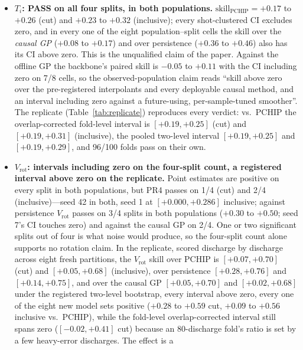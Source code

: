 \documentclass[10pt]{article}
\newcommand{\Ti}{\ensuremath{T_i}}
\newcommand{\Vrot}{\ensuremath{V_\mathrm{rot}}}
\newcommand{\skillp}{\ensuremath{\mathrm{skill}_{\mathrm{PCHIP}}}}
\begin{document}
\begin{itemize}
  \item \textbf{\Ti{}: PASS on all four splits, in both populations.}
        $\skillp = +0.17$ to $+0.26$ (cut) and $+0.23$ to $+0.32$ (inclusive);
        every shot-clustered CI excludes zero, and in every one of the eight
        population--split cells the skill over the \emph{causal GP} ($+0.08$ to
        $+0.17$) and over persistence ($+0.36$ to $+0.46$) also has its CI above
        zero. This is the unqualified claim of the paper. Against the offline GP
        the backbone's paired skill is $-0.05$ to $+0.11$ with the CI including
        zero on 7/8 cells, so the observed-population claim reads ``skill above
        zero over the pre-registered interpolants and every deployable causal
        method, and an interval including zero against a future-using,
        per-sample-tuned smoother''. The replicate (Table~\ref{tab:replicate})
        reproduces every verdict: vs.\ PCHIP the overlap-corrected fold-level
        interval is $[+0.19, +0.25]$ (cut) and $[+0.19, +0.31]$ (inclusive), the
        pooled two-level interval $[+0.19, +0.25]$ and $[+0.19, +0.29]$, and
        96/100 folds pass on their own.
  \item \textbf{\Vrot{}: intervals including zero on the four-split count, a
        registered interval above zero on the replicate.} Point estimates are positive on every split in both
        populations, but PR4 passes on 1/4 (cut) and 2/4 (inclusive)---seed 42 in
        both, seed 1 at $[+0.000, +0.286]$ inclusive; against persistence \Vrot{}
        passes on 3/4 splits in both populations ($+0.30$ to $+0.50$; seed 7's CI
        touches zero) and against the causal GP on 2/4. One or two significant
        splits out of four is what noise would produce, so the four-split count
        alone supports no rotation claim. In the replicate, scored
        discharge by discharge across eight fresh partitions, the \Vrot{} skill over
        PCHIP is $[+0.07, +0.70]$ (cut) and $[+0.05, +0.68]$ (inclusive), over
        persistence $[+0.28, +0.76]$ and $[+0.14, +0.75]$, and over the causal GP
        $[+0.05, +0.70]$ and $[+0.02, +0.68]$ under the registered two-level
        bootstrap, every interval above zero, every one of
        the eight new model sets positive ($+0.28$ to $+0.59$ cut, $+0.09$ to
        $+0.56$ inclusive vs.\ PCHIP), while the fold-level overlap-corrected
        interval still spans zero ($[-0.02, +0.41]$ cut) because an 80-discharge
        fold's ratio is set by a few heavy-error discharges. The effect is a

\end{itemize}
\end{document}
